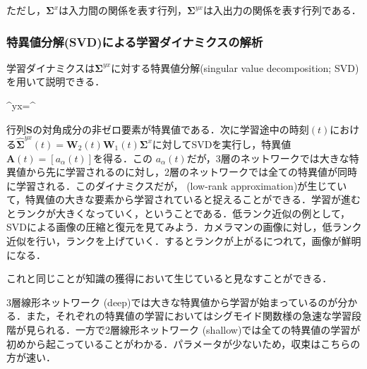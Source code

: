 ただし，$ \mathbf{\Sigma}^{x}$は入力間の関係を表す行列，$\mathbf{\Sigma}^{yx}$は入出力の関係を表す行列である．

\subsubsection{特異値分解(SVD)による学習ダイナミクスの解析}
学習ダイナミクスは$ \mathbf{\Sigma}^{yx}$に対する特異値分解(singular value decomposition; SVD)を用いて説明できる．


\mathbf{\Sigma}^{yx}=^\top


行列$ \mathbf{ S}$の対角成分の非ゼロ要素が特異値である．次に学習途中の時刻$(t)$における$\hat{\mathbf{\Sigma}}^{yx}(t)=\mathbf{W}_2 (t) \mathbf{W}_1(t) \mathbf{\Sigma}^{x}$に対してSVDを実行し，特異値$\mathbf{A}(t)=[a_{\alpha}(t)]$を得る．この $a _ {\alpha}(t)$だが，3層のネットワークでは大きな特異値から先に学習されるのに対し，2層のネットワークでは全ての特異値が同時に学習される．このダイナミクスだが，\textbf{} (low-rank approximation)が生じていて，特異値の大きな要素から学習されていると捉えることができる．学習が進むとランクが大きくなっていく，ということである．低ランク近似の例として，SVDによる画像の圧縮と復元を見てみよう．カメラマンの画像に対し，低ランク近似を行い，ランクを上げていく．するとランクが上がるにつれて，画像が鮮明になる．





これと同じことが知識の獲得において生じていると見なすことができる．





3層線形ネットワーク (deep)では大きな特異値から学習が始まっているのが分かる．また，それぞれの特異値の学習においてはシグモイド関数様の急速な学習段階が見られる．一方で2層線形ネットワーク (shallow)では全ての特異値の学習が初めから起こっていることがわかる．パラメータが少ないため，収束はこちらの方が速い．

